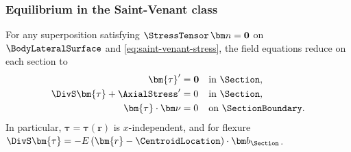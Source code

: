 \subsubsection{Equilibrium in the Saint-Venant class}
For any superposition satisfying \(\StressTensor\,\bm n=\mathbf{0}\) on \(\BodyLateralSurface\) and \eqref{eq:saint-venant-stress},
the field equations reduce on each section to
\begin{subequations}
\label{eq:sv-equilibrium}
\begin{align}
\bm{\tau}'&=\mathbf{0} && \text{in }\Section,\\
\DivS\bm{\tau}+\AxialStress'&=0 && \text{in }\Section,\\
\bm{\tau}\cdot\bm\nu&=0 && \text{on }\SectionBoundary.
\end{align}
\end{subequations}
In particular, \(\bm{\tau}=\bm{\tau}(\bm{r})\) is \(x\)-independent, and for flexure
\(\DivS\bm{\tau}=-E\,(\bm{r}-\CentroidLocation)\cdot\bm b_\Section\).
